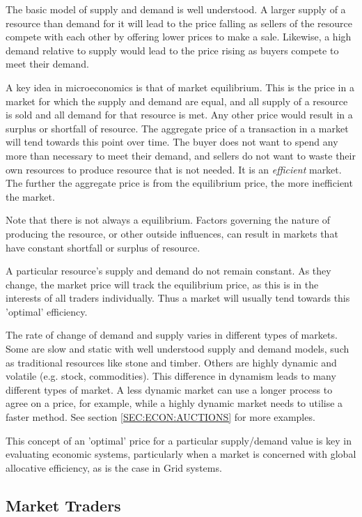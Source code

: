 The basic model of supply and demand is well understood. A larger supply of a
resource than demand for it will lead to the price falling as sellers of the
resource compete with each other by offering lower prices to make a sale.
Likewise, a high demand relative to supply would lead to the price rising as
buyers compete to meet their demand.

A key idea in microeconomics is that of market equilibrium. This is the price
in a market for which the supply and demand are equal, and all supply of a
resource is sold and all demand for that resource is met. Any other price would
result in a surplus or shortfall of resource. The aggregate price of a
transaction in a market will tend towards this point over time. The buyer does
not want to spend any more than necessary to meet their demand, and sellers do
not want to waste their own resources to produce resource that is not needed.
It is an \emph{efficient} market. The further the aggregate price is from the
equilibrium price, the more inefficient the market.

Note that there is not always a equilibrium. Factors governing the nature of
producing the resource, or other outside influences, can result in markets that
have constant shortfall or surplus of resource. 

A particular resource's supply and demand do not remain constant. As they
change, the market price will track the equilibrium price, as this is in the
interests of all traders individually. Thus a market will usually tend towards
this 'optimal' efficiency. 

The rate of change of demand and supply varies in different types of markets.
Some are slow and static with well understood supply and demand models, such as
traditional resources like stone and timber. Others are highly dynamic and volatile (e.g. stock, commodities). This
difference in dynamism leads to many different types of market. A less dynamic
market can use a longer process to agree on a price, for example, while a highly
dynamic market needs to utilise a faster method. See section
\ref{SEC:ECON:AUCTIONS} for more examples.

This concept of an 'optimal' price for a particular supply/demand value is key
in evaluating economic systems, particularly when a market is concerned with
global allocative efficiency, as is the case in Grid systems.


\subsection{Market Traders} 
\label{SEC:ECON:TRADERS}

